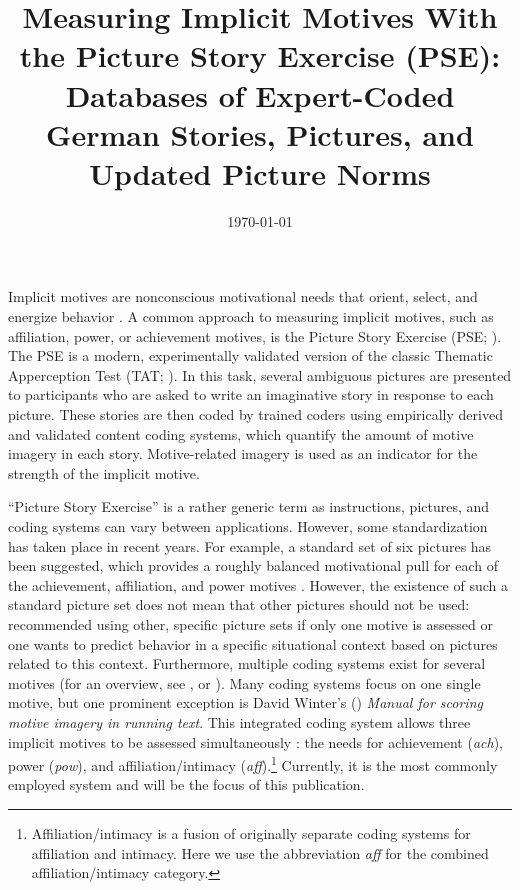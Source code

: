 \documentclass[man,a4paper,mask]{apa6}\usepackage[]{graphicx}\usepackage[]{color}
\title{Measuring Implicit Motives With the Picture Story Exercise (PSE): Databases of Expert-Coded German Stories, Pictures, and Updated Picture Norms}
\date{\today}
\begin{document}
\maketitle	%
Implicit motives are nonconscious motivational needs that orient, select, and energize behavior \parencite{mcclelland_human_1987}. A common approach to measuring implicit motives, such as affiliation, power, or achievement motives, is the Picture Story Exercise (PSE; ). The PSE is a modern, experimentally validated \parencite{mcclelland_MethodsMeasuringHuman_1958,borsboom_concept_2004} version of the classic Thematic Apperception Test (TAT; ). In this task, several ambiguous pictures are presented to participants who are asked to write an imaginative story in response to each picture. These stories are then coded by trained coders using empirically derived and validated content coding systems, which quantify the amount of motive imagery in each story. Motive-related imagery is used as an indicator for the strength of the implicit motive.

``Picture Story Exercise'' is a rather generic term as instructions, pictures, and coding systems can vary between applications. However, some standardization has taken place in recent years. For example, a standard set of six pictures has been suggested, which provides a roughly balanced motivational pull for each of the achievement, affiliation, and power motives \parencite{schultheiss_MeasuringImplicitMotives_2007}. However, the existence of such a standard picture set does not mean that other pictures should not be used: \textcite{schultheiss_MeasuringImplicitMotives_2007} recommended using other, specific picture sets if only one motive is assessed or one wants to predict behavior in a specific situational context based on pictures related to this context. Furthermore, multiple coding systems exist for several motives (for an overview, see , or ). Many coding systems focus on one single motive, but one prominent exception is David Winter's (\citeyear{winter_ManualScoringMotive_1994}) \emph{Manual for scoring motive imagery in running text}. This integrated coding system allows three implicit motives to be assessed simultaneously \parencite{winter_MeasuringPersonalityDistance_1991}: the needs for achievement (\emph{ach}), power (\emph{pow}), and affiliation/intimacy (\emph{aff}).\footnote{Affiliation/intimacy is a fusion of originally separate coding systems for affiliation and intimacy. Here we use the abbreviation \emph{aff} for the combined affiliation/intimacy category.} Currently, it is the most commonly employed system and will be the focus of this publication.
\end{document}
